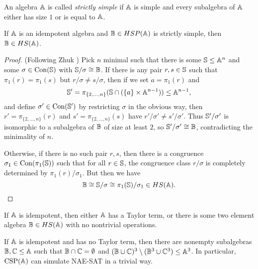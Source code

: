 \documentclass[letterpaper,11pt]{article}
\DeclareMathOperator{\CSP}{CSP}
\DeclareMathOperator{\Con}{Con}
\begin{document}
\begin{defn} An algebra $\mathbb{A}$ is called \emph{strictly simple} if $\mathbb{A}$ is simple and every subalgebra of $\mathbb{A}$ either has size $1$ or is equal to $\mathbb{A}$.
\end{defn}

\begin{lem}\label{strictly-simple-hs} If $\mathbb{A}$ is an idempotent algebra and $\mathbb{B} \in HSP(\mathbb{A})$ is strictly simple, then $\mathbb{B} \in HS(\mathbb{A})$.
\end{lem}
\begin{proof} (Following Zhuk \cite{zhuk-strong}) Pick $n$ minimal such that there is some $\mathbb{S} \le \mathbb{A}^n$ and some $\sigma \in \Con(\bS)$ with $\mathbb{S}/\sigma \cong \mathbb{B}$. If there is any pair $r,s \in \mathbb{S}$ such that $\pi_1(r) = \pi_1(s)$ but $r/\sigma \ne s/\sigma$, then if we set $a = \pi_1(r)$ and
\[
\mathbb{S}' = \pi_{\{2, ..., n\}}(\mathbb{S} \cap (\{a\} \times \mathbb{A}^{n-1})) \le \mathbb{A}^{n-1},
\]
and define $\sigma' \in \Con(\bS')$ by restricting $\sigma$ in the obvious way, then $r' = \pi_{\{2, ..., n\}}(r)$ and $s' = \pi_{\{2, ..., n\}}(s)$ have $r'/\sigma' \ne s'/\sigma'$. Thus $\mathbb{S}'/\sigma'$ is isomorphic to a subalgebra of $\mathbb{B}$ of size at least $2$, so $\mathbb{S}'/\sigma' \cong \mathbb{B}$, contradicting the minimality of $n$.

Otherwise, if there is no such pair $r,s$, then there is a congruence $\sigma_1 \in \Con(\pi_1(\bS))$ such that for all $r \in \mathbb{S}$, the congruence class $r/\sigma$ is completely determined by $\pi_1(r)/\sigma_1$. But then we have
\[
\mathbb{B} \cong \mathbb{S}/\sigma \cong \pi_1(\mathbb{S})/\sigma_1 \in HS(\mathbb{A}).\qedhere
\]
\end{proof}

\begin{cor} If $\mathbb{A}$ is idempotent, then either $\mathbb{A}$ has a Taylor term, or there is some two element algebra $\mathbb{B} \in HS(\mathbb{A})$ with no nontrivial operations.
\end{cor}

\begin{cor} If $\mathbb{A}$ is idempotent and has no Taylor term, then there are nonempty subalgebras $\mathbb{B}, \mathbb{C} \le \mathbb{A}$ such that $\mathbb{B} \cap \mathbb{C} = \emptyset$ and $(\mathbb{B} \cup \mathbb{C})^3 \setminus (\mathbb{B}^3 \cup \mathbb{C}^3) \le \mathbb{A}^3$. In particular, $\CSP(\bA)$ can simulate NAE-SAT in a trivial way.
\end{cor}
\end{document}
